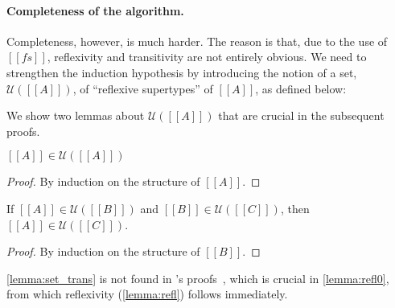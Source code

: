\paragraph{Completeness of the algorithm.}


\newcommand{\UU}[1]{\mathcal{U}(#1)}

Completeness, however, is much harder. The reason is that, due to the use of
$[[fs]]$, reflexivity and transitivity are not entirely obvious. We need to
strengthen the induction hypothesis by introducing the notion of a set,
$\UU{[[A]]}$, of ``reflexive supertypes'' of $[[A]]$, as defined below:
We show two lemmas about $\UU{[[A]]}$ that are crucial in the subsequent proofs.
\begin{lemma} \label{lemma:set_refl}
  $[[A]] \in \UU{[[A]]}$
\end{lemma}
\begin{proof}
  By induction on the structure of $[[A]]$.
\end{proof}

\begin{lemma} \label{lemma:set_trans}
  If $[[A]] \in \UU{[[B]]}$ and $[[B]] \in \UU{[[C]]}$, then $[[A]] \in \UU{[[C]]}$.
\end{lemma}
\begin{proof}
  By induction on the structure of $[[B]]$.
\end{proof}

\begin{remark}
  \cref{lemma:set_trans} is not found in \citeauthor{pierce1989decision}'s proofs~\citep{pierce1989decision}, which is
  crucial in \cref{lemma:refl0}, from which reflexivity (\cref{lemma:refl})
  follows immediately.
\end{remark}


